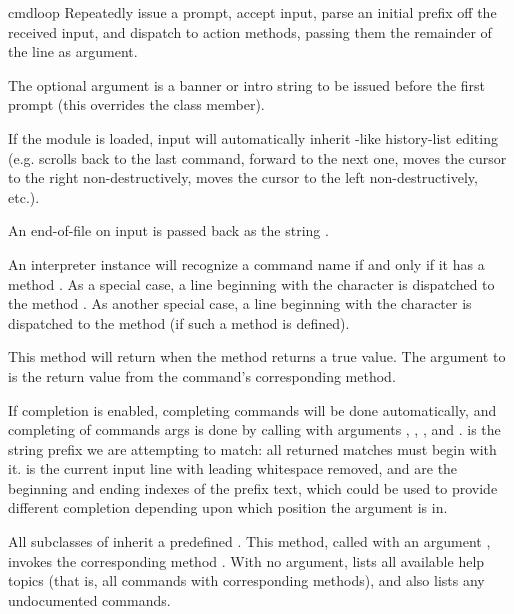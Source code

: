 \begin{methoddesc}{cmdloop}{}
Repeatedly issue a prompt, accept input, parse an initial prefix off
the received input, and dispatch to action methods, passing them the
remainder of the line as argument.

The optional argument is a banner or intro string to be issued before the
first prompt (this overrides the  class member).

If the  module is loaded, input will automatically
inherit -like history-list editing (e.g. 
scrolls back to the last command,  forward to the next
one,  moves the cursor to the right non-destructively,
 moves the cursor to the left non-destructively, etc.).

An end-of-file on input is passed back as the string .

An interpreter instance will recognize a command name  if
and only if it has a method .  As a special case,
a line beginning with the character  is dispatched to
the method .  As another special case, a line
beginning with the character \character{!} is dispatched to the
method  (if such a method is defined).

This method will return when the  method returns a
true value.  The  argument to  is the
return value from the command's corresponding  method.

If completion is enabled, completing commands will be done
automatically, and completing of commands args is done by calling
 with arguments , ,
, and .   is the string prefix we
are attempting to match: all returned matches must begin with it.
 is the current input line with leading whitespace removed,
 and  are the beginning and ending indexes
of the prefix text, which could be used to provide different
completion depending upon which position the argument is in.

All subclasses of  inherit a predefined .
This method, called with an argument , invokes the
corresponding method .  With no argument,
 lists all available help topics (that is, all
commands with corresponding  methods), and also lists
any undocumented commands.
\end{methoddesc}

